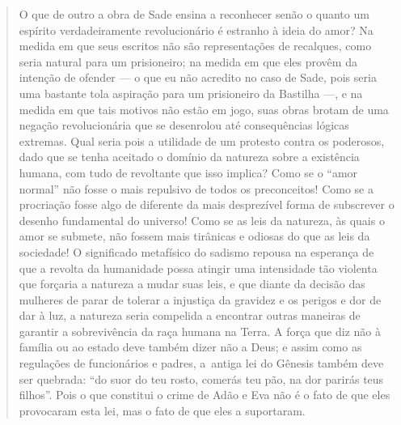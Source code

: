 \begin{quote} 
O que de outro a obra de Sade ensina a reconhecer senão o quanto um espírito verdadeiramente revolucionário é estranho à ideia do amor? Na medida em que seus escritos não são representações de recalques, como seria natural para um prisioneiro; na medida em que eles provêm da intenção de ofender --- o que eu não acredito no caso de Sade, pois seria uma bastante tola aspiração para um prisioneiro da Bastilha ---, e na medida em que tais motivos não estão em jogo, suas obras brotam de uma negação revolucionária que se desenrolou até consequências lógicas extremas. Qual seria pois a utilidade de um protesto contra os poderosos, dado que se tenha aceitado o domínio da natureza sobre a existência humana, com tudo de revoltante que isso implica? Como se o ``amor normal'' não fosse o mais repulsivo de todos os preconceitos! Como se a procriação fosse algo de diferente da mais desprezível forma de subscrever o desenho fundamental do universo! Como se as leis da natureza, às quais o amor se submete, não fossem mais tirânicas e odiosas do que as leis da sociedade! O significado metafísico do sadismo repousa na esperança de que a revolta da humanidade possa atingir uma intensidade tão violenta que forçaria a natureza a mudar suas leis, e que diante da decisão das mulheres de parar de tolerar a injustiça da gravidez e os perigos e dor de dar à luz, a natureza seria compelida a encontrar outras maneiras de garantir a sobrevivência da raça humana na Terra. A força que diz não à família ou ao estado deve também dizer não a Deus; e assim como as regulações de funcionários e padres, a~antiga lei do Gênesis também deve ser quebrada: ``do suor do teu rosto, comerás teu pão, na dor parirás teus filhos''. Pois o que constitui o crime de Adão e Eva não é o fato de que eles provocaram esta lei, mas o fato de que eles a suportaram.
\end{quote}

